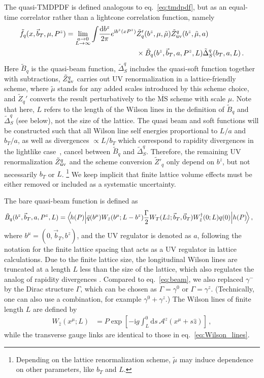\documentclass[11pt,a4paper]{article}
\DeclareRobustCommand{\eq}[1]{eq.~\eqref{eq:#1}}
\newcommand{\MS}{{\overline{\mathrm{MS}}}}
\newcommand{\df}{\mathrm{d}}
\newcommand{\img}{\mathrm{i}}
\newcommand{\cA}{\mathcal{A}}
\newcommand{\nn}{\nonumber}
\newcommand{\bt}{\vec b_T}
\begin{document}
The quasi-TMDPDF is defined analogous to \eq{tmdpdf}, but as an equal-time correlator rather than a lightcone correlation function, namely
\begin{align} \label{eq:qtmdpdf}
 \tilde f_q(x, \bt,\mu,P^z) =
 \lim_{\substack{a\to 0 \\ L\to \infty}}
 \int\! \frac{\df b^z}{2\pi} e^{\img b^z (x P^z)}
 &\tilde Z'_q(b^z,\mu,\tilde \mu) \tilde Z_{\rm uv}^q(b^z,\tilde \mu, a)
 \nn\\&\times
 \tilde B_q(b^z, \bt, a, P^z, L) \tilde\Delta_S^q(b_T, a, L)
\,.\end{align}
Here $\tilde B_q$ is the quasi-beam function, $\tilde \Delta_S^q$ includes the quasi-soft function together with subtractions, $\tilde Z_{\rm uv}^q$ carries out UV renormalization in a lattice-friendly scheme, where $\tilde \mu$ stands for any added scales introduced by this scheme choice, and $\tilde Z_q'$ converts the result perturbatively to the $\MS$ scheme with scale $\mu$.
Note that here, $L$ refers to the length of the Wilson lines in the definition of $\tilde B_q$ and $\tilde\Delta_S^q$ (see below), not the size of the lattice.
The quasi beam and soft functions will be constructed such that all Wilson line self energies proportional to $L/a$ and $b_T/a$, as well as divergences $\propto L/b_T$ which correspond to rapidity divergences in the lightlike case~\cite{Ji:2018hvs,Ebert:2019okf}, cancel between $\tilde B_q$ and $\tilde\Delta_S^q$. Therefore, the remaining UV renormalization $\tilde Z_{\rm uv}^q$ and the scheme conversion $\tilde Z'_q$ only depend on $b^z$, but not necessarily $b_T$ or $L$.%
\footnote{Depending on the lattice renormalization scheme, $\tilde\mu$ may induce dependence on other parameters, like $b_T$ and $L$.}
We keep implicit that finite lattice volume effects must be either removed or included as a systematic uncertainty.

The bare quasi-beam function is defined as
\begin{align} \label{eq:qbeam}
 \tilde B_q(b^z, \bt, a, P^z, L) =
 \Bigl<\! h(P) \Big| &\bar q(b^\mu) W_{\hat z}(b^\mu;L-b^z) \frac{\Gamma}{2}
 W_T(L \hat z; \bt, \vec{0}_T) W^\dagger_{\hat z}(0;L) q(0) \Big| h(P) \!\Bigr>
\,,\end{align}
where $b^\mu = (0, \bt, b^z)$, and the UV regulator is denoted as $a$, following the notation for the finite lattice spacing that acts as a UV regulator in lattice calculations.
Due to the finite lattice size, the longitudinal Wilson lines are truncated at a length $L$ less than the size of the lattice, which also regulates the analog of rapidity divergences \cite{Ji:2018hvs,Ebert:2019okf}.
Compared to \eq{beam}, we also replaced $\gamma^-$ by the Dirac structure $\Gamma$, which can be chosen as $\Gamma = \gamma^0$ or $\Gamma = \gamma^z$.
(Technically, one can also use a combination, for example $\gamma^0 + \gamma^z$.)
The Wilson lines of finite length $L$ are defined by
\begin{align} \label{eq:coll_Wilson_L}
 W_{\hat z}(x^\mu;L) &= P \exp\left[ -\img g \int_{L}^0 \df s \, \cA^z(x^\mu + s \hat z) \right]
\,,\end{align}
while the transverse gauge links are identical to those in \eq{Wilson_lines}.
\end{document}
